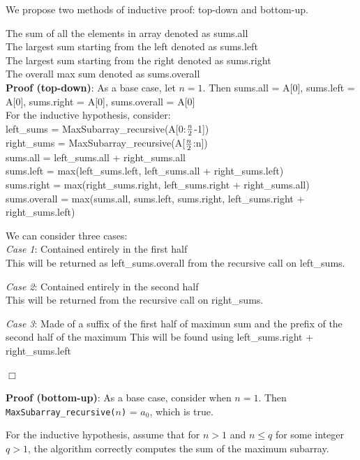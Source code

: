\documentclass[a4paper,10pt]{article}
\begin{document}
		We propose two methods of inductive proof: top-down and bottom-up.

  		The sum of all the elements in array denoted as sums.all\\
  		The largest sum starting from the left denoted as sums.left\\
  		The largest sum starting from the right denoted as sums.right\\
  		The overall max sum denoted as sums.overall\\
 
		{\bf Proof (top-down)}: As a base case, let $n=1$. Then sums.all = A[0], sums.left = A[0], sums.right = A[0], sums.overall = A[0]\\
  
  		For the inductive hypothesis, consider:\\
  			left\_sums = MaxSubarray\_recursive(A[0:$n \over 2$-1])\\
  			right\_sums = MaxSubarray\_recursive(A[$n \over 2$:n])\\
  			sums.all = left\_sums.all + right\_sums.all\\
  			sums.left = max(left\_sums.left, left\_sums.all + right\_sums.left)\\
  			sums.right = max(right\_sums.right, left\_sums.right + right\_sums.all)
  			sums.overall = max(sums.all, sums.left, sums.right, left\_sums.right + right\_sums.left)
  
		We can consider three cases:\\

  		{\it Case 1}: Contained entirely in the first half\\
  				This will be returned as left\_sums.overall from the recursive call on left\_sums.
  
  		{\it Case 2}: Contained entirely in the second half\\
  				This will be returned from the recursive call on right\_sums.
  
  		{\it Case 3}: Made of a suffix of the first half of maximun sum and the prefix of the second half of the maximum
  				This will be found using left\_sums.right + right\_sums.left

		\begin{center}
		$\Box$
		\end{center}

		{\bf Proof (bottom-up)}: As a base case, consider when $n=1$. Then {\tt MaxSubarray\_recursive($n$)} = $a_0$, which is true.

		For the inductive hypothesis, assume that for $n > 1$ and $n \leq q$ for some integer $q>1$, the algorithm correctly computes the sum of the maximum subarray.
\end{document}
